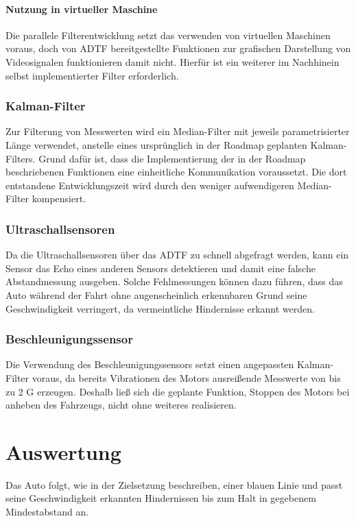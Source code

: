 \documentclass[12pt, a4paper]{scrartcl}
\begin{document}
\paragraph{Nutzung in virtueller Maschine}
Die parallele Filterentwicklung setzt das verwenden von virtuellen Maschinen voraus, doch von ADTF bereitgestellte Funktionen zur grafischen Darstellung von Videosignalen funktionieren damit nicht. Hierfür ist ein weiterer im Nachhinein selbst implementierter Filter erforderlich.

\subsubsection{Kalman-Filter}
Zur Filterung von Messwerten wird ein Median-Filter mit jeweils parametrisierter Länge verwendet, anstelle eines ursprünglich in der Roadmap geplanten Kalman-Filters. Grund dafür ist, dass die Implementierung der in der Roadmap beschriebenen Funktionen eine einheitliche Kommunikation voraussetzt. Die dort entstandene Entwicklungszeit wird durch den weniger aufwendigeren Median-Filter kompensiert.

\subsubsection{Ultraschallsensoren}
Da die Ultraschallsensoren über das ADTF zu schnell abgefragt werden, kann ein Sensor das Echo eines anderen Sensors detektieren und damit eine falsche Abstandmessung ausgeben. Solche Fehlmessungen können dazu führen, dass das Auto während der Fahrt ohne augenscheinlich erkennbaren Grund seine Geschwindigkeit verringert, da vermeintliche Hindernisse erkannt werden.

\subsubsection{Beschleunigungssensor}
Die Verwendung des Beschleunigungssensors setzt einen angepassten Kalman-Filter voraus, da bereits Vibrationen des Motors ausreißende Messwerte von bis zu 2 G erzeugen. Deshalb ließ sich die geplante Funktion, Stoppen des Motors bei anheben des Fahrzeugs, nicht ohne weiteres realisieren. 

\newpage
\section{Auswertung}
Das Auto folgt, wie in der Zielsetzung beschreiben, einer blauen Linie und passt seine Geschwindigkeit erkannten Hindernissen bis zum Halt in gegebenem Mindestabstand an.
\end{document}
